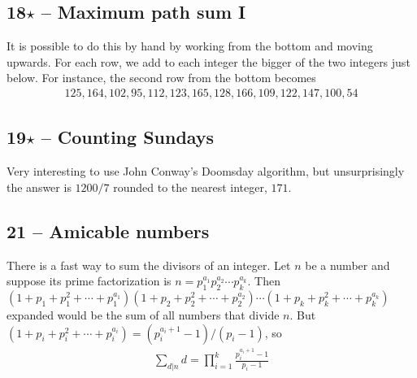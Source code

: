 \documentclass{article}
\begin{document}
\subsection*{18$\star$ -- Maximum path sum I} 
It is possible to do this by hand by working from the bottom and moving upwards.
For each row, we add to each integer the bigger of the two integers just below.
For instance, the second row from the bottom becomes
\begin{align*}
	125, 164, 102, 95, 112, 123, 165, 128, 166, 109, 122, 147, 100, 54
\end{align*}

\subsection*{19$\star$ -- Counting Sundays} 
Very interesting to use John Conway's Doomsday algorithm, but unsurprisingly the answer is $1200/7$ rounded to the nearest integer, $\boxed{171}$.

\subsection*{21 -- Amicable numbers} 
There is a fast way to sum the divisors of an integer. 
Let $n$ be a number and suppose its prime factorization is $n = p_1^{a_1} p_2^{a_2} \cdots p_k^{a_k}$. 
Then $(1+p_1+p_1^2+\cdots+p_1^{a_1})(1+p_2+p_2^2+\cdots+p_2^{a_2}) \cdots (1+p_k+p_k^2+\cdots+p_k^{a_k})$ expanded would be the sum of all numbers that divide $n$. 
But $(1+p_i+p_i^2+\cdots+p_i^{a_i}) = (p_i^{a_i+1}-1)/(p_i-1)$, so 
\begin{align*}
	\sum_{d|n} d = \prod_{i=1}^k \frac{p_i^{a_i+1}-1}{p_i-1} 
\end{align*}
\end{document}
